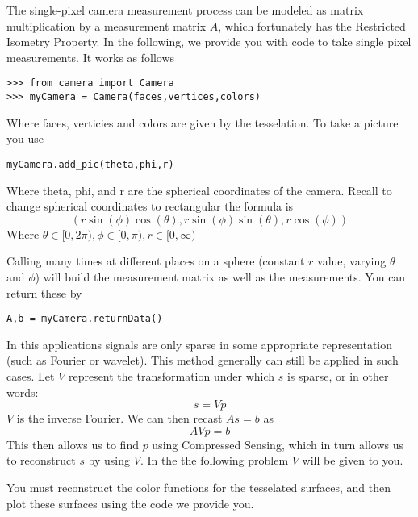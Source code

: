 The single-pixel camera measurement process can be modeled as matrix multiplication
by a measurement matrix $A$, which fortunately has the Restricted Isometry Property. In the following,
we provide you with code to take single pixel measurements. It works as follows 
\begin{lstlisting}
>>> from camera import Camera
>>> myCamera = Camera(faces,vertices,colors)
\end{lstlisting}
Where faces, verticies and colors are given by the tesselation. To take a picture you use 
\begin{lstlisting}
myCamera.add_pic(theta,phi,r)
\end{lstlisting}
Where theta, phi, and r are the spherical coordinates of the camera. Recall to change spherical coordinates to rectangular the formula is   
\[
(r\sin(\phi)\cos(\theta),r\sin(\phi)\sin(\theta),r\cos(\phi))
\]
Where $\theta \in [0,2\pi),\phi \in [0,\pi), r \in [0,\infty)$

Calling  many times at different places on a sphere (constant $r$ value, varying $\theta$ and $\phi$) will build the measurement matrix as well as the measurements. You can return these by
\begin{lstlisting}
A,b = myCamera.returnData()
\end{lstlisting}

In this applications signals are only sparse in some appropriate representation (such as Fourier or wavelet). This method generally can still be applied in such cases. Let $V$ represent the transformation under which $s$ is sparse, or in other words:
\begin{equation}
s = V p
\end{equation}
$V$ is the inverse Fourier. We can then recast $A s=b$ as
\begin{equation}
A V p = b
\end{equation}
This then allows us to find $p$ using Compressed Sensing, which in turn allows us to reconstruct $s$ by using $V$. In the the following problem $V$ will be given to you.

You must reconstruct the color functions
for the tesselated surfaces, and then plot these surfaces using the code we provide you.

